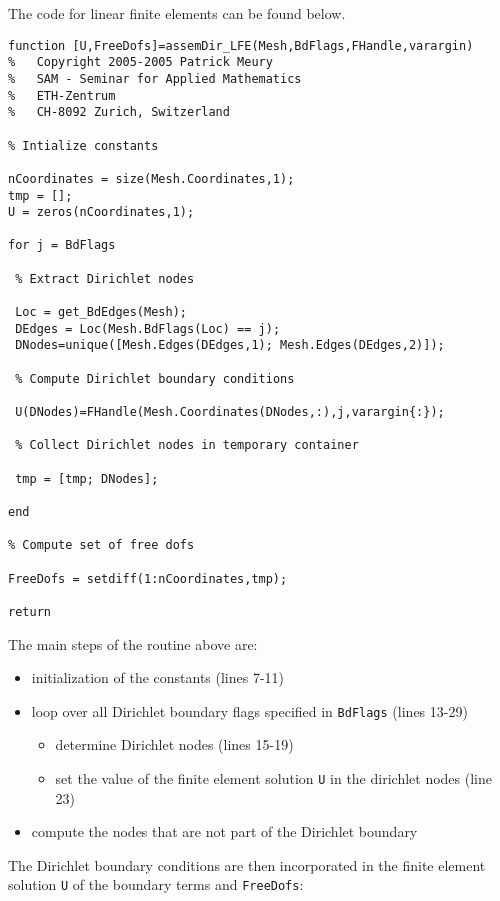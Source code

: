 The code for linear finite elements can be found below.

\begin{lstlisting}
function [U,FreeDofs]=assemDir_LFE(Mesh,BdFlags,FHandle,varargin)
%   Copyright 2005-2005 Patrick Meury
%   SAM - Seminar for Applied Mathematics
%   ETH-Zentrum
%   CH-8092 Zurich, Switzerland

% Intialize constants

nCoordinates = size(Mesh.Coordinates,1);
tmp = [];
U = zeros(nCoordinates,1);
 
for j = BdFlags
  
 % Extract Dirichlet nodes
  
 Loc = get_BdEdges(Mesh);
 DEdges = Loc(Mesh.BdFlags(Loc) == j);
 DNodes=unique([Mesh.Edges(DEdges,1); Mesh.Edges(DEdges,2)]);
  
 % Compute Dirichlet boundary conditions
  
 U(DNodes)=FHandle(Mesh.Coordinates(DNodes,:),j,varargin{:});  
  
 % Collect Dirichlet nodes in temporary container
    
 tmp = [tmp; DNodes];
    
end
  
% Compute set of free dofs
  
FreeDofs = setdiff(1:nCoordinates,tmp);
  
return
\end{lstlisting}

The main steps of the routine above are:
\begin{itemize}
 \item initialization of the constants (lines 7-11)
 \item loop over all Dirichlet boundary flags specified in \texttt{BdFlags} (lines 13-29)
 \begin{itemize}
  \item determine Dirichlet nodes (lines 15-19)
  \item set the value of the finite element solution \texttt{U} in the dirichlet nodes (line 23)
 \end{itemize}
 \item compute the nodes that are not part of the Dirichlet boundary
\end{itemize}



 The Dirichlet boundary conditions are then incorporated in the finite element solution {\tt U} of the boundary terms and {\tt FreeDofs}:


